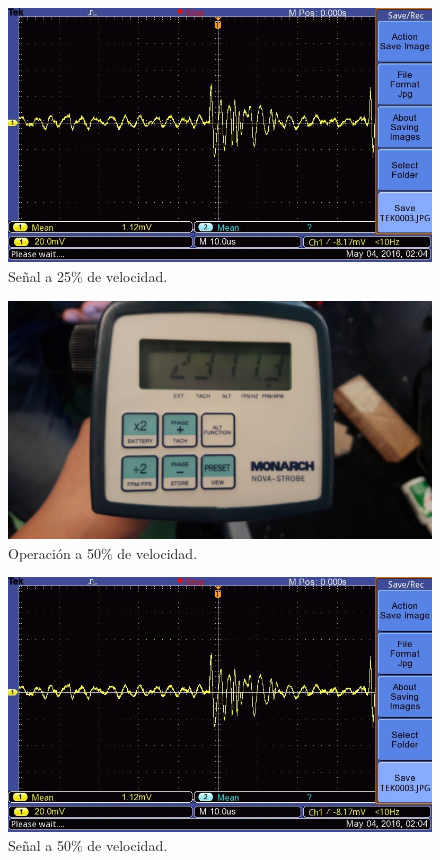   \begin{figure}[!htbp]
 \centering
 \includegraphics [scale=0.25]
 {./img/tek0003.jpg}
  \caption{Se\~nal a 25\% de velocidad.}
 \end{figure}

  \begin{figure}[!htbp]
 \centering
 \includegraphics [scale=0.2]
 {./img/2311.jpg}
  \caption{Operaci\'on a 50\% de velocidad.}
 \end{figure}

  \begin{figure}[!htbp]
 \centering
 \includegraphics [scale=0.25]
 {./img/tek0003.jpg}
  \caption{Se\~nal a 50\% de velocidad.}
 \end{figure}

